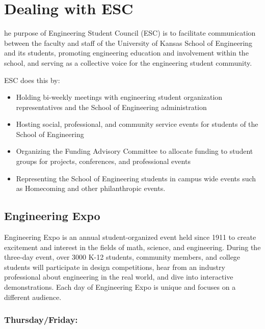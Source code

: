 %
%
\let\textcircled=\pgftextcircled
\chapter{Dealing with ESC}
\label{chap:esc}

he purpose of Engineering Student Council (ESC) is to facilitate communication between the faculty and staff of the University of Kansas School of Engineering and its students, promoting engineering education and involvement within the school, and serving as a collective voice for the engineering student community.
 
ESC does this by:
\begin{itemize}
	\item Holding bi-weekly meetings with engineering student organization representatives and the School of Engineering administration
	\item Hosting social, professional, and community service events for students of the School of Engineering
	\item Organizing the Funding Advisory Committee to allocate funding to student groups for projects, conferences, and professional events
	\item Representing the School of Engineering students in campus wide events such as Homecoming and other philanthropic events.
\end{itemize}


\section{Engineering Expo}
\label{sec:sec01}

Engineering Expo is an annual student-organized event held since 1911 to create excitement and interest in the fields of math, science, and engineering. During the three-day event, over 3000 K-12 students, community members, and college students will participate in design competitions, hear from an industry professional about engineering in the real world, and dive into interactive demonstrations.  Each day of Engineering Expo is unique and focuses on a different audience.

\subsection*{Thursday/Friday:}

